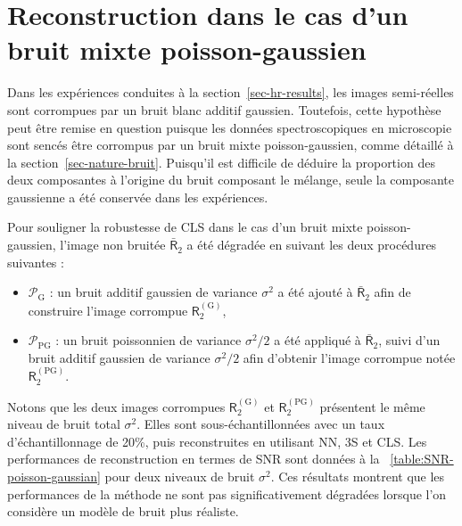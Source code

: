 \section{Reconstruction dans le cas d'un bruit mixte poisson-gaussien}\label{sec-bruit-mixte}

Dans les expériences conduites à la section~\ref{sec-hr-results}, les images semi-réelles sont corrompues par un bruit blanc additif gaussien. Toutefois, cette hypothèse peut être remise en question puisque les données spectroscopiques en microscopie sont sencés être corrompus par un bruit mixte poisson-gaussien, comme détaillé à la section~\ref{sec-nature-bruit}. Puisqu'il est difficile de déduire la proportion des deux composantes à l'origine du bruit composant le mélange, seule la composante gaussienne a été conservée dans les expériences.

Pour souligner la robustesse de CLS dans le cas d'un bruit mixte poisson-gaussien, l'image non bruitée $\bar{\mathsf{R}}_2$ a été dégradée en suivant les deux procédures suivantes :
\begin{itemize}
    \item $\mathcal{P}_{\mathrm{G}}$ : un bruit additif gaussien de variance $\sigma^2$ a été ajouté à $\bar{\mathsf{R}}_2$ afin de construire l'image corrompue $\mathsf{R}_2^{(\mathrm{G})}$,
    \item $\mathcal{P}_{\mathrm{PG}}$ : un bruit poissonnien de variance $\sigma^2/2$ a été appliqué à $\bar{\mathsf{R}}_2$, suivi d'un bruit additif gaussien de variance $\sigma^2/2$ afin d'obtenir l'image corrompue notée $\mathsf{R}_2^{(\mathrm{PG})}$.
\end{itemize}
Notons que les deux images corrompues $\mathsf{R}_2^{(\mathrm{G})}$ et $\mathsf{R}_2^{(\mathrm{PG})}$ présentent le même niveau de bruit total $\sigma^2$. Elles sont sous-échantillonnées avec un taux d'échantillonnage de 20\%, puis reconstruites en utilisant NN, 3S et CLS. Les performances de reconstruction en termes de SNR sont données à la \tabname~\ref{table:SNR-poisson-gaussian} pour deux niveaux de bruit $\sigma^2$. Ces résultats montrent que les performances de la méthode ne sont pas significativement dégradées lorsque l'on considère un modèle de bruit plus réaliste.

